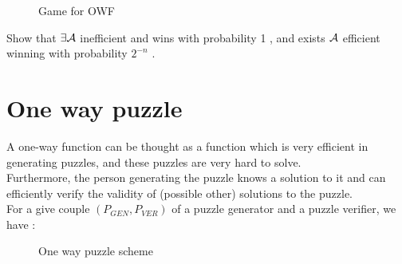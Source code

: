 \begin{figure}[h!]
   \centering
   \sdinit{}
   \caption{Game for OWF}
   \label{fig:game_owf}
\end{figure}

\begin{exercise}
Show that $\exists  \mathcal{A}$
inefficient and wins with probability 1 ,  and exists $\mathcal{A}$ efficient winning
with probability $2^{-n}$ .
\end{exercise}

\newpage

\section{One way puzzle}
A one-way function can be thought as a function which is very efficient in
generating puzzles, and these puzzles are very hard to solve.\\
Furthermore, the person generating the puzzle knows a solution to it and can
efficiently verify the validity of (possible other) solutions to the puzzle.\\

For a give couple  $(P_{GEN},P_{VER})$ of a puzzle generator and a puzzle
verifier, we have :
\begin{figure}[h!]
   \centering
   \sdinit{}
   \caption{One way puzzle scheme}
   \label{fig:owp}
\end{figure}

